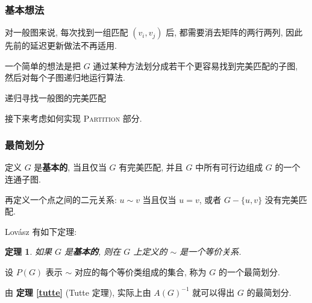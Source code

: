 \documentclass[a4paper]{article}
\newtheorem{theorem}{\hspace{2em}定理}
\begin{document}
			\subsubsection{基本想法}

				\hspace{2em}对一般图来说, 每次找到一组匹配 $(v_i, v_j)$ 后, 都需要消去矩阵的两行两列, 因此先前的延迟更新做法不再适用.

				一个简单的想法是把 $G$ 通过某种方法划分成若干个更容易找到完美匹配的子图, 然后对每个子图递归地运行算法.

				\begin{algorithm}
					\caption{递归寻找一般图的完美匹配}

					\begin{algorithmic}[1]
							\Else
							\EndIf
						\EndFunction
					\end{algorithmic}
				\end{algorithm}

				接下来考虑如何实现 \textsc{Partition} 部分.
			
			\subsubsection{最简划分}
				
				\hspace{2em}定义 $G$ 是\textbf{基本的}, 当且仅当 $G$ 有完美匹配, 并且 $G$ 中所有可行边组成 $G$ 的一个连通子图.

				再定义一个点之间的二元关系: $u \sim v$ 当且仅当 $u = v$, 或者 $G - \{u, v\}$ 没有完美匹配.
				
				Lov\'asz \cite{lovasz} 有如下定理:

				\begin{theorem}
					如果 $G$ 是\textbf{基本的}, 则在 $G$ 上定义的 $\sim$ 是一个等价关系.
				\end{theorem}

				设 $P(G)$ 表示 $\sim$ 对应的每个等价类组成的集合, 称为 $G$ 的一个最简划分.

				由 {\bfseries 定理 \ref{tutte}} (Tutte 定理), 实际上由 $A(G)^{-1}$ 就可以得出 $G$ 的最简划分.
\end{document}
